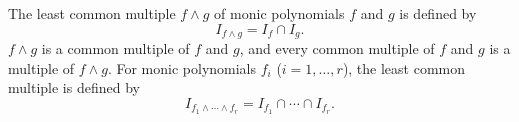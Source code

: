 The least common multiple $f \wedge g$ of monic polynomials $f$ and $g$ is defined by
$$I_{f \wedge g} = I_f \cap I_g.$$
$f \wedge g$ is a common multiple of $f$ and $g$, and every common multiple of $f$ and $g$ is a multiple of $f \wedge g$. For monic polynomials $f_i$ ($i = 1, \ldots, r$), the least common multiple is defined by
$$I_{f_1 \wedge \cdots \wedge f_r} = I_{f_1} \cap \cdots \cap I_{f_r}.$$
